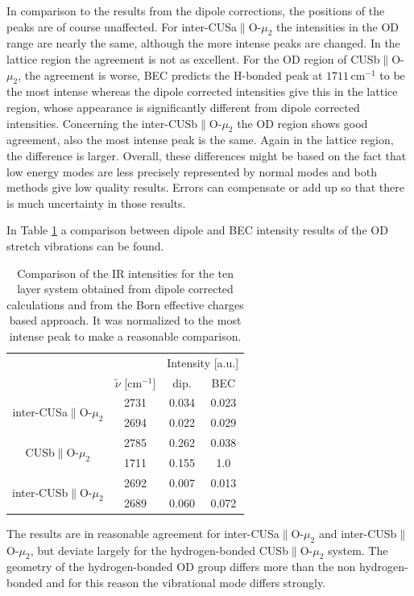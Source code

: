 \documentclass[11pt,DIV=13,BCOR=5mm,a4paper,headinclude]{scrbook}
\begin{document}
In comparison to the results from the dipole corrections, the positions of the peaks are of course unaffected.
For inter-CUSa$\parallel$O-$\mu_2$ the intensities in the OD range are nearly the same, although the more intense peaks are changed.
In the lattice region the agreement is not as excellent.
For the OD region of CUSb$\parallel$O-$\mu_2$, the agreement is worse, BEC predicts the H-bonded peak at $1711\,$cm$^{-1}$ to be the most intense whereas the dipole corrected intensities give this in the lattice region, whose appearance is significantly different from dipole corrected intensities.
Concerning the inter-CUSb$\parallel$O-$\mu_2$ the OD region shows good agreement, also the most intense peak is the same.
Again in the lattice region, the difference is larger.
Overall, these differences might be based on the fact that low energy modes are less precisely represented by normal modes and both methods give low quality results.
Errors can compensate or add up so that there is much uncertainty in those results.


In Table \ref{tab:freq_lowcov_comp} a comparison between dipole and BEC intensity results of the OD stretch vibrations can be found.
\begin{table}[!h]
\centering
\caption{Comparison of the IR intensities for the ten layer system obtained from dipole corrected calculations and from the Born effective charges based approach.
It was normalized to the most intense peak to make a reasonable comparison.}
\begin{tabular}{cc|cc}
\toprule
&&\multicolumn{2}{c}{Intensity [a.u.]}\\
&$\tilde{\nu}$ [cm$^{-1}$]& dip. & BEC \\\midrule
\multirow{2}{3cm}{inter-CUSa$\parallel$O-$ \mu_2$}&2731 &0.034 &0.023 \\
 &2694&0.022 &0.029 \\\hline
\multirow{2}{3cm}{CUSb$\parallel$O-$ \mu_2$} & 2785&0.262 &0.038 \\
 & 1711& 0.155&1.0 \\\hline
\multirow{2}{3cm}{inter-CUSb$\parallel$O-$ \mu_2$}& 2692& 0.007&0.013 \\
 & 2689& 0.060& 0.072\\\bottomrule
\end{tabular}
\label{tab:freq_lowcov_comp}
\end{table}
The results are in reasonable agreement for inter-CUSa$\parallel$O-$ \mu_2$ and inter-CUSb$\parallel$O-$ \mu_2$, but deviate largely for the hydrogen-bonded CUSb$\parallel$O-$ \mu_2$ system.
The geometry of the hydrogen-bonded OD group differs more than the non hydrogen-bonded and for this reason the vibrational mode differs strongly.
\end{document}
